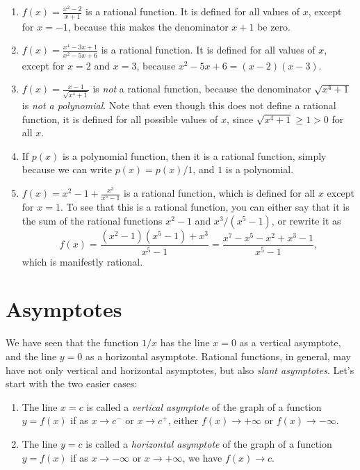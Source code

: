 \documentclass{ximera}
\begin{document}
\begin{example}\mbox{}
  \begin{enumerate}
  \item $f(x) = \frac{x^2-2}{x+1}$ is a rational function. It is defined for all values of $x$, except for $x = -1$, because this makes the denominator $x+1$ be zero.
  \item $f(x) = \frac{x^4-3x+1}{x^2-5x+6}$ is a rational function. It is defined for all values of $x$, except for $x=2$ and $x=3$, because $x^2-5x+6 = (x-2)(x-3)$. 
  \item $f(x) = \frac{x-1}{\sqrt{x^4+1}}$ is \emph{not} a rational function, because the denominator $\sqrt{x^4+1}$ is \emph{not a polynomial}. Note that even though this does not define a rational function, it is defined for all possible values of $x$, since $\sqrt{x^4+1} \geq 1 > 0$ for all $x$.
  \item If $p(x)$ is a polynomial function, then it is a rational function, simply because we can write $p(x) = p(x)/1$, and $1$ is a polynomial.
  \item $f(x) = x^2-1 + \frac{x^3}{x^5-1}$ is a rational function, which is defined for all $x$ except for $x=1$. To see that this is a rational function, you can either say that it is the sum of the rational functions $x^2-1$ and $x^3/(x^5-1)$, or rewrite it as \[  f(x) = \frac{(x^2-1)(x^5-1) + x^3}{x^5-1} = \frac{x^7-x^5-x^2+x^3-1}{x^5-1},  \]which is manifestly rational.
  \end{enumerate}
\end{example}

\section{Asymptotes}

We have seen that the function $1/x$ has the line $x=0$ as a vertical asymptote, and the line $y=0$ as a horizontal asymptote. Rational functions, in general, may have not only vertical and horizontal asymptotes, but also \emph{slant asymptotes}. Let's start with the two easier cases:

\begin{definition}
  \mbox{}
  \begin{enumerate}
  \item The line $x=c$ is called a \emph{vertical asymptote} of the graph of a function $y=f(x)$ if as $x \to c^-$ or $x \to c^+$, either $f(x) \to +\infty$ or $f(x) \to -\infty$.
  \item The line $y=c$ is called a \emph{horizontal asymptote} of the graph of a function $y=f(x)$ if as $x \to -\infty$ or $x \to +\infty$, we have $f(x) \to c$.
  \end{enumerate}
\end{definition}
\end{document}
